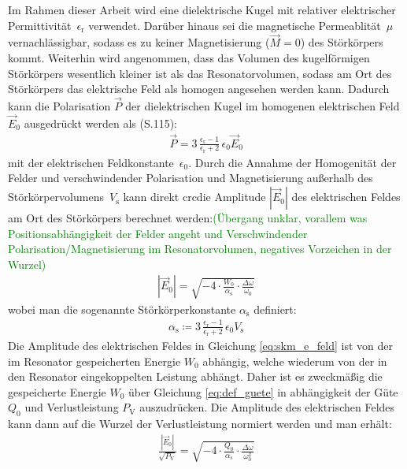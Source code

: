 \documentclass[11pt, a4paper]{scrbook}
\newcommand{\ve}{\vec{E}}
\newcommand{\todo}[1]{{\textcolor{Green}{(#1)}}}
\begin{document}
	Im Rahmen dieser Arbeit wird eine dielektrische Kugel mit relativer elektrischer Permittivität~$\epsilon_\mathrm{r}$ verwendet.
	Darüber hinaus sei die magnetische Permeablität~$\mu$ vernachlässigbar, sodass es zu keiner Magnetisierung ($\vec{M} = 0$) des Störkörpers kommt.
	Weiterhin wird angenommen, dass das Volumen des kugelförmigen Störkörpers wesentlich kleiner ist als das Resonatorvolumen, sodass am Ort des Störkörpers das elektrische Feld als homogen angesehen werden kann.
	Dadurch kann die Polarisation $\vec{P}$ der dielektrischen Kugel im homogenen elektrischen Feld $\ve_0$ ausgedrückt werden als \cite{jackson} (S.115):
	\begin{align}
		\vec{P} = 3 \, \frac{\epsilon_\mathrm{r} - 1}{\epsilon_\mathrm{r} + 2} \, \epsilon_0 \ve_0
		\label{eq:polarisation_kugel}
	\end{align}
	mit der elektrischen Feldkonstante~$\epsilon_0$.
	Durch die Annahme der Homogenität der Felder und verschwindender Polarisation und Magnetisierung außerhalb des Störkörpervolumens~$V_\mathrm{s}$ kann direkt crcdie Amplitude $|\ve_0|$ des elektrischen Feldes am Ort des Störkörpers berechnet werden:\todo{Übergang unklar, vorallem was Positionsabhängigkeit der Felder angeht und Verschwindender Polarisation/Magnetisierung im Resonatorvolumen, negatives Vorzeichen in der Wurzel}
	\begin{align}
		|\ve_0| = \sqrt{-4 \cdot \frac{W_0}{\alpha_\mathrm{s}} \cdot \frac{\Delta \omega}{\omega_0}} \label{eq:skm_e_feld}
	\end{align}
	wobei man die sogenannte Störkörperkonstante $\alpha_\mathrm{s}$ definiert:
	\begin{align}
		\alpha_\mathrm{s} \coloneqq 3 \, \frac{\epsilon_\mathrm{r} - 1}{\epsilon_\mathrm{r} + 2} \, \epsilon_0 V_\mathrm{s}
	\end{align}
	Die Amplitude des elektrischen Feldes in Gleichung \eqref{eq:skm_e_feld} ist von der im Resonator gespeicherten Energie $W_0$ abhängig, welche wiederum von der in den Resonator eingekoppelten Leistung abhängt.
	Daher ist es zweckmäßig die gespeicherte Energie $W_0$ über Gleichung \eqref{eq:def_guete} in abhängigkeit der Güte $Q_0$ und Verlustleistung $P_\mathrm{V}$ auszudrücken.
	Die Amplitude des elektrischen Feldes kann dann auf die Wurzel der Verlustleistung normiert werden und man erhält:
	\begin{align}
		\frac{|\ve_0|}{\sqrt{P_\mathrm{V}}} = \sqrt{-4 \cdot \frac{Q_0}{\alpha_s} \cdot \frac{\Delta \omega}{\omega_0^2}}
	\end{align}	
	
\end{document}

